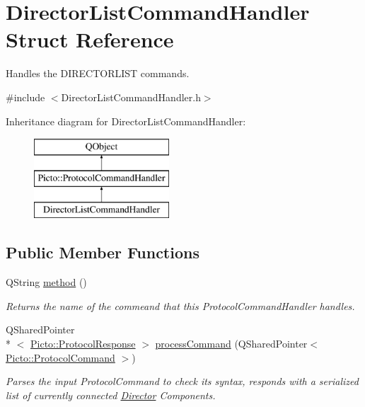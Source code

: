 \hypertarget{struct_director_list_command_handler}{\section{Director\-List\-Command\-Handler Struct Reference}
\label{struct_director_list_command_handler}
}


Handles the D\-I\-R\-E\-C\-T\-O\-R\-L\-I\-S\-T commands.  




{\ttfamily \#include $<$Director\-List\-Command\-Handler.\-h$>$}

Inheritance diagram for Director\-List\-Command\-Handler\-:\begin{figure}[H]
\begin{center}
\leavevmode
\includegraphics[height=3.000000cm]{struct_director_list_command_handler}
\end{center}
\end{figure}
\subsection*{Public Member Functions}
\begin{DoxyCompactItemize}
\item 
\hypertarget{struct_director_list_command_handler_acdd7c850050fb86d3c38caa7b72097e8}{Q\-String \hyperlink{struct_director_list_command_handler_acdd7c850050fb86d3c38caa7b72097e8}{method} ()}\label{struct_director_list_command_handler_acdd7c850050fb86d3c38caa7b72097e8}

\begin{DoxyCompactList}\small\item\em Returns the name of the commeand that this Protocol\-Command\-Handler handles. \end{DoxyCompactList}\item 
Q\-Shared\-Pointer\\*
$<$ \hyperlink{struct_picto_1_1_protocol_response}{Picto\-::\-Protocol\-Response} $>$ \hyperlink{struct_director_list_command_handler_a4b1507123771cf468e861bbd3b5b0812}{process\-Command} (Q\-Shared\-Pointer$<$ \hyperlink{struct_picto_1_1_protocol_command}{Picto\-::\-Protocol\-Command} $>$)
\begin{DoxyCompactList}\small\item\em Parses the input Protocol\-Command to check its syntax, responds with a serialized list of currently connected \hyperlink{class_director}{Director} Components. \end{DoxyCompactList}\end{DoxyCompactItemize}


